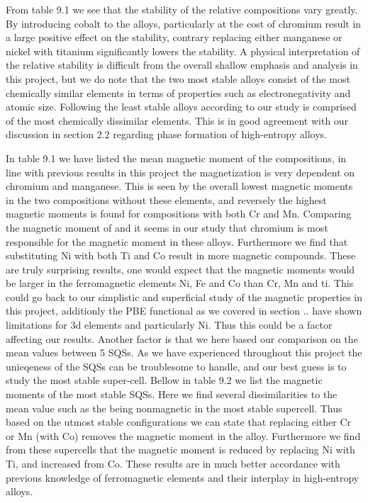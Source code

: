 From table 9.1 we see that the stability of the relative compositions vary greatly. By introducing cobalt to the alloys, particularly at the cost of chromium result in a large positive effect on the stability, contrary replacing either manganese or nickel with titanium significantly lowers the stability. A physical interpretation of the relative stability is difficult from the overall shallow emphasis and analysis in this project, but we do note that the two most stable alloys consist of the most chemically similar elements in terms of properties such as electronegativity and atomic size. Following the least stable alloys according to our study is comprised of the most chemically dissimilar elements. This is in good agreement with our discussion in section 2.2 regarding phase formation of high-entropy alloys.


In table 9.1 we have listed the mean magnetic moment of the compositions, in line with previous results in this project the magnetization is very dependent on chromium and manganese. This is seen by the overall lowest magnetic moments in the two compositions without these elements, and reversely the highest magnetic moments is found for compositions with both Cr and Mn. Comparing the magnetic moment of  and  it seems in our study that chromium is most responsible for the magnetic moment in these alloys. Furthermore we find that substituting Ni with both Ti and Co result in more magnetic compounds. These are truly surprising results, one would expect that the magnetic moments would be larger in the ferromagnetic elements Ni, Fe and Co than Cr, Mn and ti. This could go back to our simplistic and superficial study of the magnetic properties in this project, additionly the PBE functional as we covered in section .. have shown limitations for 3d elements and particularly Ni. Thus this could be a factor affecting our results. Another factor is that we here based our comparison on the mean values between 5 SQSs. As we have experienced throughout this project the unieqeness of the SQSs can be troublesome to handle, and our best guess is to study the most stable super-cell. Bellow in table 9.2 we list the magnetic moments of the most stable SQSs. Here we find several dissimilarities to the mean value such as the  being nonmagnetic in the most stable supercell. Thus based on the utmost stable configurations we can state that replacing either Cr or Mn (with Co) removes the magnetic moment in the alloy. Furthermore we find from these supercells that the magnetic moment is reduced by replacing Ni with Ti, and increased from Co. These results are in much better accordance with previous knowledge of ferromagnetic elements and their interplay in high-entropy alloys.

